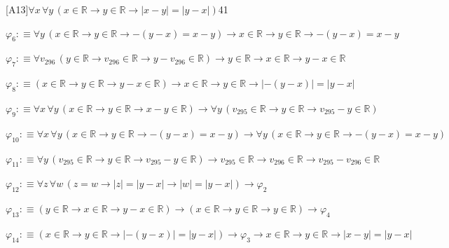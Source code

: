 \begin{fullproof}{[A13]}{$\forall x\,\forall y\,(x \in \mathbb{R} \to y \in \mathbb{R} \to \lvert x - y \rvert = \lvert y - x \rvert)$}{41}
\begin{abbrevlist}
\item $\varphi_{6} :\equiv \forall y\,(x \in \mathbb{R} \to y \in \mathbb{R} \to -(y - x) = x - y) \to x \in \mathbb{R} \to y \in \mathbb{R} \to -(y - x) = x - y$
\item $\varphi_{7} :\equiv \forall v_{296}\,(y \in \mathbb{R} \to v_{296} \in \mathbb{R} \to y - v_{296} \in \mathbb{R}) \to y \in \mathbb{R} \to x \in \mathbb{R} \to y - x \in \mathbb{R}$
\item $\varphi_{8} :\equiv (x \in \mathbb{R} \to y \in \mathbb{R} \to y - x \in \mathbb{R}) \to x \in \mathbb{R} \to y \in \mathbb{R} \to \lvert -(y - x) \rvert = \lvert y - x \rvert$
\item $\varphi_{9} :\equiv \forall x\,\forall y\,(x \in \mathbb{R} \to y \in \mathbb{R} \to x - y \in \mathbb{R}) \to \forall y\,(v_{295} \in \mathbb{R} \to y \in \mathbb{R} \to v_{295} - y \in \mathbb{R})$
\item $\varphi_{10} :\equiv \forall x\,\forall y\,(x \in \mathbb{R} \to y \in \mathbb{R} \to -(y - x) = x - y) \to \forall y\,(x \in \mathbb{R} \to y \in \mathbb{R} \to -(y - x) = x - y)$
\item $\varphi_{11} :\equiv \forall y\,(v_{295} \in \mathbb{R} \to y \in \mathbb{R} \to v_{295} - y \in \mathbb{R}) \to v_{295} \in \mathbb{R} \to v_{296} \in \mathbb{R} \to v_{295} - v_{296} \in \mathbb{R}$
\item $\varphi_{12} :\equiv \forall z\,\forall w\,(z = w \to \lvert z \rvert = \lvert y - x \rvert \to \lvert w \rvert = \lvert y - x \rvert) \to \varphi_{2}$
\item $\varphi_{13} :\equiv (y \in \mathbb{R} \to x \in \mathbb{R} \to y - x \in \mathbb{R}) \to (x \in \mathbb{R} \to y \in \mathbb{R} \to y \in \mathbb{R}) \to \varphi_{4}$
\item $\varphi_{14} :\equiv (x \in \mathbb{R} \to y \in \mathbb{R} \to \lvert -(y - x) \rvert = \lvert y - x \rvert) \to \varphi_{3} \to x \in \mathbb{R} \to y \in \mathbb{R} \to \lvert x - y \rvert = \lvert y - x \rvert$
\end{abbrevlist}
\end{fullproof}
